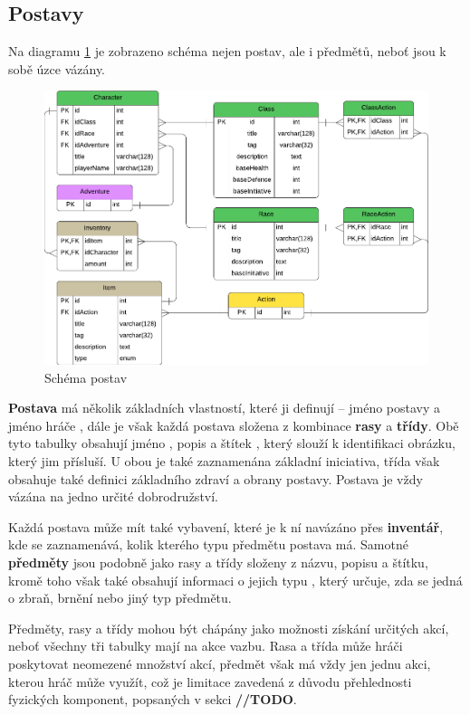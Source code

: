 \subsection{Postavy}
\label{subsec:schema_character}

Na diagramu \ref{diag:er_character} je zobrazeno schéma nejen postav, ale i předmětů, neboť jsou k sobě úzce vázány. 

\begin{figure}[h]
    \centering
    \includegraphics{../../shared/diagrams/er_character.pdf}
    \caption{Schéma postav}
    \label{diag:er_character}
\end{figure}

\textbf{Postava} má několik základních vlastností, které ji definují -- jméno postavy  a jméno hráče , dále je však každá postava složena z kombinace \textbf{rasy} a \textbf{třídy}. Obě tyto tabulky obsahují jméno , popis  a štítek , který slouží k identifikaci obrázku, který jim přísluší. U obou je také zaznamenána základní iniciativa, třída však obsahuje také definici základního zdraví a obrany postavy. Postava je vždy vázána na jedno určité dobrodružství.

Každá postava může mít také vybavení, které je k ní navázáno přes \textbf{inventář}, kde se zaznamenává, kolik kterého typu předmětu postava má. Samotné \textbf{předměty} jsou podobně jako rasy a třídy složeny z názvu, popisu a štítku, kromě toho však také obsahují informaci o jejich typu , který určuje, zda se jedná o zbraň, brnění nebo jiný typ předmětu.

Předměty, rasy a třídy mohou být chápány jako možnosti získání určitých akcí, neboť všechny tři tabulky mají na akce vazbu. Rasa a třída může hráči poskytovat neomezené množství akcí, předmět však má vždy jen jednu akci, kterou hráč může využít, což je limitace zavedená z důvodu přehlednosti fyzických komponent, popsaných v sekci \textbf{//TODO}.



